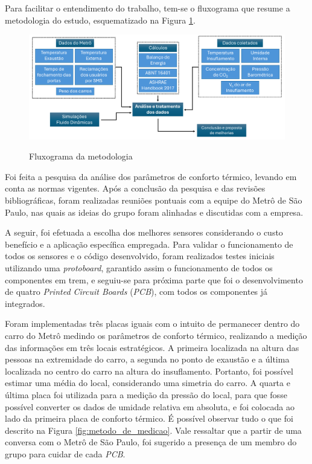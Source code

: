 \documentclass[acronym,symbols,table]{fei}
\begin{document}
Para facilitar o entendimento do trabalho, tem-se o fluxograma que resume a metodologia do estudo, esquematizado na Figura \ref{fig: Fluxograma}.

\begin{figure}[!htb] 
 \centering
    \caption{Fluxograma da metodologia}
    \includegraphics[width=1\linewidth]{Imagens/Fluxograma_da_metodologia.png}
    \label{fig: Fluxograma}
\end{figure}
\newpage
Foi feita a pesquisa da análise dos parâmetros de conforto térmico, levando em conta as normas vigentes. Após a conclusão da pesquisa e das revisões bibliográficas, foram realizadas reuniões pontuais com a equipe do Metrô de São Paulo, nas quais as ideias do grupo foram alinhadas e discutidas com a empresa. 

A seguir, foi efetuada a escolha dos melhores sensores considerando o custo benefício e a aplicação específica empregada. Para validar o funcionamento de todos os sensores e o código desenvolvido, foram realizados testes iniciais utilizando uma \textit{protoboard}, garantido assim o funcionamento de todos os componentes em trem, e seguiu-se para próxima parte que foi o desenvolvimento de quatro \textit{Printed Circuit Boards} (\textit{PCB}), com todos os componentes já integrados. 

Foram implementadas três placas iguais com o intuito de permanecer dentro do carro do Metrô medindo os parâmetros de conforto térmico, realizando a medição das informações em três locais estratégicos. A primeira localizada na altura das pessoas na extremidade do carro, a segunda no ponto de exaustão e a última localizada no centro do carro na altura do insuflamento. Portanto, foi possível estimar uma média do local, considerando uma simetria do carro. A quarta e última placa foi utilizada para a medição da pressão do local, para que fosse possível converter os dados de umidade relativa em absoluta, e foi colocada ao lado da primeira placa de conforto térmico. É possível observar tudo o que foi descrito na Figura \ref{fig:metodo_de_medicao}. Vale ressaltar que a partir de uma conversa com o Metrô de São Paulo, foi sugerido a presença de um membro do grupo para cuidar de cada \textit{PCB}.
\end{document}

